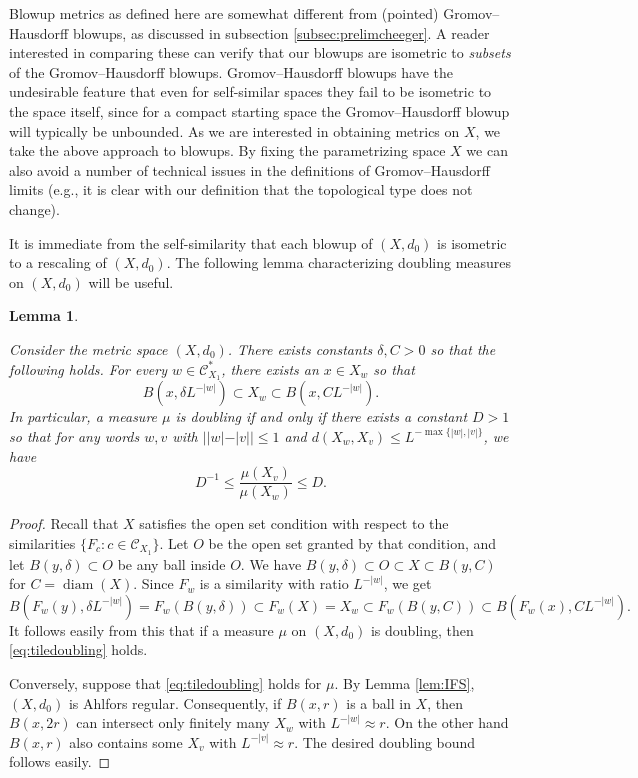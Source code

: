 \documentclass{amsart}
\DeclareMathOperator{\diam}{diam}
\theoremstyle{plain}
\newtheorem{lemma}[theorem]{Lemma}
\theoremstyle{definition}
\numberwithin{equation}{section}
\numberwithin{theorem}{section}
\newcommand{\cC}{\mathcal{C}}
\begin{document}
Blowup metrics as defined here are somewhat different from (pointed) Gromov--Hausdorff blowups, as discussed in subsection \ref{subsec:prelimcheeger}.
A reader interested in comparing these can verify that our blowups are isometric to \emph{subsets} of the  Gromov--Hausdorff blowups. Gromov--Hausdorff blowups have the undesirable feature that even for self-similar spaces they fail to be isometric to the space itself, since for a compact starting space the Gromov--Hausdorff blowup will typically be unbounded. As we are interested in obtaining metrics on $X$, we take the above approach to blowups. By fixing the parametrizing space $X$ we can also avoid a number of technical issues in the definitions of Gromov--Hausdorff limits (e.g., it is clear with our definition that the topological type does not change).

It is immediate from the self-similarity that each blowup of $(X,d_0)$ is isometric to a rescaling of $(X,d_0)$.  The following lemma characterizing doubling measures on $(X,d_0)$ will be useful.

\begin{lemma}\label{lem:balls}

Consider the metric space $(X,d_0)$. There exists constants $\delta,C>0$ so that the following holds. For every $w\in \cC_{X_1}^*$, there exists an $x\in X_w$ so that
\[
B(x,\delta L^{-|w|})\subset X_w \subset B(x,CL^{-|w|}).
\]
In particular, a measure $\mu$ is doubling if and only if there exists a constant $D>1$ so that for any words $w,v$ with $||w|-|v||\leq 1$ and $d(X_w, X_v)\leq L^{-\max\{|w|,|v|\}}$, we have
\begin{equation}\label{eq:tiledoubling}
D^{-1}\leq \frac{\mu(X_{v})}{\mu(X_w)}\leq D.
\end{equation}
\end{lemma}
\begin{proof} Recall that $X$ satisfies the open set condition with respect to the similarities $\{F_c: c\in\cC_{X_1}\}$. Let $O$ be the open set granted by that condition, and let $B(y,\delta)\subset O$ be any ball inside $O$. We have $B(y,\delta)\subset O \subset X \subset B(y,C)$ for $C=\diam(X)$. Since $F_w$ is a similarity with ratio $L^{-|w|}$, we get 
\[
B(F_w(y),\delta L^{-|w|})=F_w(B(y,\delta))\subset F_w(X) =X_w \subset F_w(B(y,C)) \subset B(F_w(x),CL^{-|w|}).
\]
It follows easily from this that if a measure $\mu$ on $(X,d_0)$ is doubling, then \eqref{eq:tiledoubling} holds.

Conversely, suppose that \eqref{eq:tiledoubling} holds for $\mu$. By Lemma \ref{lem:IFS}, $(X,d_0)$ is Ahlfors regular. Consequently, if $B(x,r)$ is a ball in $X$, then $B(x,2r)$ can intersect only finitely many $X_w$ with $L^{-|w|}\approx r$. On the other hand $B(x,r)$ also contains some $X_v$ with $L^{-|v|}\approx r$. The desired doubling bound follows easily.
\end{proof}
\end{document}
